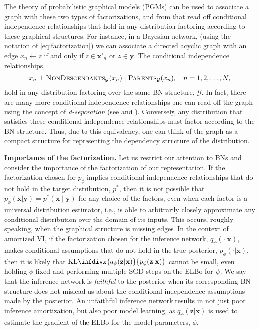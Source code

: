 The theory of probabilistic graphical models (PGMs) \citep{KollerFriedman2009} can be used to associate a graph with these two types of factorizations, and from that read off conditional independence relationships that hold in any distribution factoring according to these graphical structures. For instance, in a Bayesian network, (using the notation of \eqref{eq:factorization}) we can associate a directed acyclic graph with an edge $x_n\leftarrow z$ if and only if $z\in\mathbf{x}'_n$ or $z\in\mathbf{y}$. The conditional independence relationships,
\begin{align*}
	x_n\perp\text{\scshape NonDescendants}_\mathcal{G}(x_n)\mid\text{\scshape Parents}_\mathcal{G}(x_n),\ \ \ n=1,2,\ldots,N,
\end{align*}
hold in any distribution factoring over the same BN structure, $\mathcal{G}$. In fact, there are many more conditional independence relationships one can read off the graph using the concept of \emph{d-separation} (see \citep{KollerFriedman2009} and \citep[A.1]{WebbEtAl2018}). Conversely, any distribution that satisfies these conditional independence relationships must factor according to the BN structure. Thus, due to this equivalency, one can think of the graph as a compact structure for representing the dependency structure of the distribution.

{\bfseries Importance of the factorization.} Let us restrict our attention to BNs and consider the importance of the factorization of our representation. If the factorization chosen for $p_\phi$ implies conditional independence relationships that do not hold in the target distribution, $p^*$, then it is not possible that $p_\phi(\mathbf{x}|\mathbf{y})=p^*(\mathbf{x}\mid\mathbf{y})$ for any choice of the factors, even when each factor is a universal distribution estimator, i.e., is able to arbitrarily closely approximate any conditional distribution over the domain of its inputs. This occurs, roughly speaking, when the graphical structure is missing edges. In the context of amortized VI, if the factorization chosen for the inference network, $q_\psi(\cdot|\mathbf{x})$, makes conditional assumptions that do not hold in the true posterior, $p_\phi(\cdot|\mathbf{x})$, then it is likely that $\text{KL}\infdivx{q_\psi(\mathbf{z}|\mathbf{x})}{p_\phi(\mathbf{z}|\mathbf{x})}$ cannot be small, even holding $\phi$ fixed and performing multiple SGD steps on the ELBo for $\psi$. We say that the inference network is \emph{faithful} to the posterior when its corresponding BN structure does not mislead us about the conditional independence assumptions made by the posterior. An unfaithful inference network results in not just poor inference amortization, but also poor model learning, as $q_\psi(\mathbf{z}|\mathbf{x})$ is used to estimate the gradient of the ELBo for the model parameters, $\phi$.

